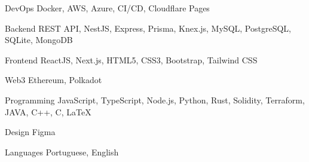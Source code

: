 

\begin{cvskills}

  \cvskill
    {DevOps} %
    {Docker, AWS, Azure, CI/CD, Cloudflare Pages} %

  \cvskill
    {Backend} %
    {REST API, NestJS, Express, Prisma, Knex.js, MySQL, PostgreSQL, SQLite, MongoDB} %

  \cvskill
    {Frontend} %
    {ReactJS, Next.js, HTML5, CSS3, Bootstrap, Tailwind CSS} %

  \cvskill
    {Web3} %
    {Ethereum, Polkadot} %

  \cvskill
    {Programming} %
    {JavaScript, TypeScript, Node.js, Python, Rust, Solidity, Terraform, JAVA, C++, C, LaTeX} %

  \cvskill
    {Design} %
    {Figma} %

  \cvskill
    {Languages} %
    {Portuguese, English} %

\end{cvskills}
